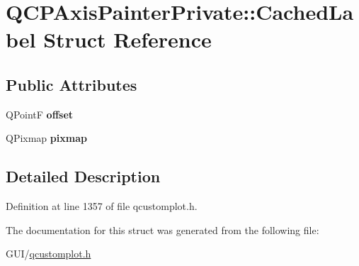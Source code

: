 \hypertarget{struct_q_c_p_axis_painter_private_1_1_cached_label}{}\section{Q\+C\+P\+Axis\+Painter\+Private\+:\+:Cached\+Label Struct Reference}
\label{struct_q_c_p_axis_painter_private_1_1_cached_label}
\subsection*{Public Attributes}
\begin{DoxyCompactItemize}
\item 
\mbox{\label{struct_q_c_p_axis_painter_private_1_1_cached_label_a5f502db71c92e572f1e6f44f62c59d8e}} 
Q\+PointF {\bfseries offset}
\item 
\mbox{\label{struct_q_c_p_axis_painter_private_1_1_cached_label_a461597cbd470914a9d24b64d16037a88}} 
Q\+Pixmap {\bfseries pixmap}
\end{DoxyCompactItemize}


\subsection{Detailed Description}


Definition at line 1357 of file qcustomplot.\+h.



The documentation for this struct was generated from the following file\+:\begin{DoxyCompactItemize}
\item 
G\+U\+I/\hyperlink{qcustomplot_8h}{qcustomplot.\+h}\end{DoxyCompactItemize}
